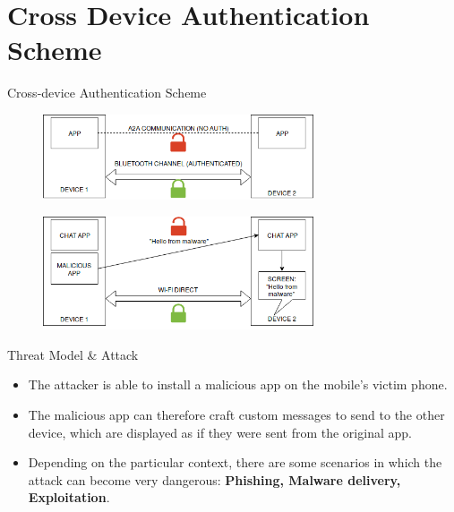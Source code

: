 \documentclass[10pt]{beamer}
\begin{document}
\section{Cross Device Authentication Scheme}
\begin{frame}[fragile]{Cross-device Authentication Scheme}



   
  \begin{figure}[bhp]
    \centering
	\includegraphics[width=80mm]{img/2-background}
     \end{figure}

     \begin{figure}[bhp]
    \centering
	\includegraphics[width=80mm]{img/2-malware}
     \end{figure}
  
 
  
\end{frame}

\begin{frame}[fragile]{Threat Model \& Attack}

  \begin{itemize}


  \item The attacker is able to install a malicious app on the
    mobile's victim phone.

  \item The malicious app can therefore craft custom messages to send
    to the other device, which are displayed as if they were sent from
    the original app.

  \item Depending on the particular context, there are some scenarios
    in which the attack can become very dangerous: {\bf Phishing,
      Malware delivery, Exploitation}.

  \end{itemize}

  
\end{frame}
\end{document}
